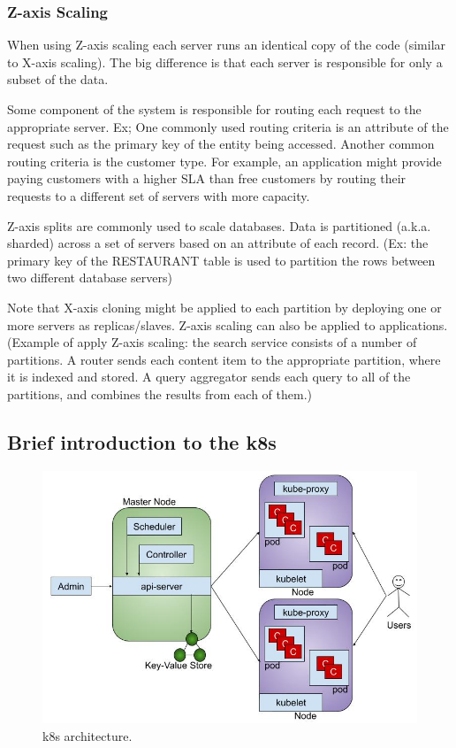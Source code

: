 \subsubsection{Z-axis Scaling}
When using Z-axis scaling each server runs an identical copy of the code (similar to X-axis scaling). The big difference is that each server is responsible for only a subset of the data. 

Some component of the system is responsible for routing each request to the appropriate server. Ex;
One commonly used routing criteria is an attribute of the request such as the primary key of the entity being accessed. 
Another common routing criteria is the customer type. For example, an application might provide paying customers with a higher SLA than free customers by routing their requests to a different set of servers with more capacity.

Z-axis splits are commonly used to scale databases. Data is partitioned (a.k.a. sharded) across a set of servers based on an attribute of each record. (Ex: the primary key of the RESTAURANT table is used to partition the rows between two different database servers)

Note that X-axis cloning might be applied to each partition by deploying one or more servers as replicas/slaves. Z-axis scaling can also be applied to applications.
(Example of apply Z-axis scaling: the search service consists of a number of partitions. A router sends each content item to the appropriate partition, where it is indexed and stored. A query aggregator sends each query to all of the partitions, and combines the results from each of them.)

\subsection{Brief introduction to the \acrfull{k8s}}
\label{sebse:k8s_intro}

\begin{figure}[htp]
    \centering
    \includegraphics[width=1\textwidth]{method/microservice/k8s_architecture_v3.jpg}
    \caption{\acrfull{k8s} architecture.}
    \label{fi:k8s_architecture}
\end{figure}

